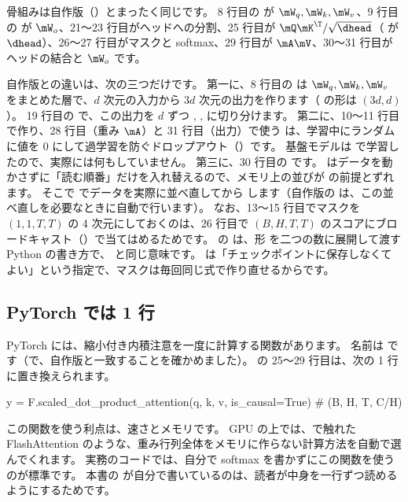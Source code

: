 骨組みは自作版（）とまったく同じです。
8 行目の  が $\mW_q,\mW_k,\mW_v$、9 行目の  が $\mW_o$、21〜23 行目がヘッドへの分割、25 行目が $\mQ\mK^\T/\sqrt{\dhead}$（ が $\dhead$）、26〜27 行目がマスクと softmax、29 行目が $\mA\mV$、30〜31 行目がヘッドの結合と $\mW_o$ です。

自作版との違いは、次の三つだけです。
第一に、8 行目の  は $\mW_q,\mW_k,\mW_v$ をまとめた層で、$d$ 次元の入力から $3d$ 次元の出力を作ります（ の形は $(3d,d)$）。
19 行目の  で、この出力を $d$ ずつ , ,  に切り分けます。
第二に、10〜11 行目で作り、28 行目（重み $\mA$）と 31 行目（出力）で使う  は、学習中にランダムに値を 0 にして過学習を防ぐドロップアウト（）です。
基盤モデルは  で学習したので、実際には何もしていません。
第三に、30 行目の  です。
 はデータを動かさずに「読む順番」だけを入れ替えるので、メモリ上の並びが  の前提とずれます。
そこで  でデータを実際に並べ直してから  します（自作版の  は、この並べ直しを必要なときに自動で行います）。
なお、13〜15 行目でマスクを $(1,1,T,T)$ の 4 次元にしておくのは、26 行目で $(B,H,T,T)$ のスコアにブロードキャスト（）で当てはめるためです。
 の \code{*} は、形  を二つの数に展開して渡す Python の書き方で、 と同じ意味です。
 は「チェックポイントに保存しなくてよい」という指定で、マスクは毎回同じ式で作り直せるからです。

\subsection*{PyTorch では 1 行}

PyTorch には、縮小付き内積注意を一度に計算する関数があります。
名前は  です（で、自作版と一致することを確かめました）。
の 25〜29 行目は、次の 1 行に置き換えられます。

\begin{pycode}
y = F.scaled_dot_product_attention(q, k, v, is_causal=True)  # (B, H, T, C/H)
\end{pycode}

この関数を使う利点は、速さとメモリです。
GPU の上では、で触れた FlashAttention のような、重み行列全体をメモリに作らない計算方法を自動で選んでくれます。
実務のコードでは、自分で softmax を書かずにこの関数を使うのが標準です。
本書の  が自分で書いているのは、読者が中身を一行ずつ読めるようにするためです。

